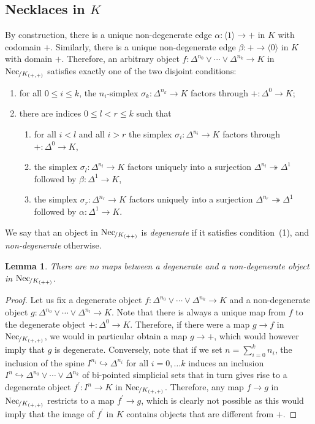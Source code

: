 \documentclass[reqno]{amsart}
\numberwithin{equation}{subsection}
\theoremstyle{plain}
\newtheorem{lemma}[equation]{Lemma}
\theoremstyle{definition}
\let\into=\hookrightarrow
\let\onto=\twoheadrightarrow
\DeclareMathOperator{\Nec}{Nec}
\newcommand{\ord}[1]{\langle#1\rangle}
\newcommand{\Over}[2]{#1_{\hspace{-1pt}/#2}}
\begin{document}
\subsection{Necklaces in $K$}
 By construction, there is a unique non-degenerate edge $\alpha\colon\ord{1}\to +$ in $K$ with codomain $+$. Similarly, there is a unique non-degenerate edge $\beta\colon+\to \ord{0}$ in $K$ with domain $+$. Therefore, an arbitrary object $f\colon\Delta^{n_0}\vee\cdots\vee\Delta^{n_k}\to K$ in $\Over{\Nec}{K_{(+,+)}}$ satisfies exactly one of the two disjoint conditions:
\begin{enumerate}
	\item for all $0\leq i\leq k$, the $n_i$-simplex $\sigma_k\colon\Delta^{n_k}\to K$ factors through $+\colon\Delta^0\to K$;
	\item there are indices $0\leq l<r\leq k$ such that
	\begin{enumerate}
	\item for all $i<l$ and all $i>r$ the simplex $\sigma_i\colon \Delta^{n_i}\to K$ factors through $+\colon\Delta^0\to K$,
	\item the simplex $\sigma_{l}\colon \Delta^{n_l}\to K$ factors uniquely into a surjection $\Delta^{n_l}\onto \Delta^1$ followed by $\beta\colon\Delta^1\to K$,
	\item  the simplex $\sigma_{r}\colon \Delta^{n_r}\to K$ factors uniquely into a surjection $\Delta^{n_r}\onto\Delta^1$ followed by $\alpha\colon\Delta^1\to K$.
	\end{enumerate}
\end{enumerate}
We say that an object in $\Over{\Nec}{K_{(++)}}$ is \emph{degenerate} if it satisfies condition~(1), and \emph{non-degenerate} otherwise.
\begin{lemma}
	\label{lem:mapsDegenerateNondegenerateNecklaces}
	There are no maps between a degenerate and a non-degenerate object in $\Over{\Nec}{K_{(++)}}$.
\end{lemma}
\begin{proof}
	Let us fix a degenerate object $f\colon\Delta^{n_0}\vee\cdots\vee\Delta^{n_k}\to K$ and a non-degenerate object $g\colon\Delta^{n_0}\vee\cdots\vee\Delta^{n_l}\to K$. Note that there is always a unique map from $f$ to the degenerate object $+\colon\Delta^0\to K$. Therefore, if there were a map $g\to f$ in $\Over{\Nec}{K_{(+,+)}}$, we would in particular obtain a map $g\to +$, which would however imply that $g$ is degenerate. Conversely, note that if we set $n=\sum_{i=0}^k n_i$, the inclusion of the spine $I^{n_i}\into \Delta^{n_i}$ for all $i=0,\dots k$ induces an inclusion $I^n\into \Delta^{n_0}\vee\cdots\vee\Delta^{n_k}$ of bi-pointed simplicial sets that in turn gives rise to a degenerate object $f^\prime\colon I^n\to K$ in $\Over{\Nec}{K_{(+,+)}}$. Therefore, any map $f\to g$ in $\Over{\Nec}{K_{(+,+)}}$ restricts to a map $f^\prime\to g$, which is clearly not possible as this would imply that the image of $f^\prime$ in $K$ contains objects that are different from $+$.
\end{proof}
\end{document}
